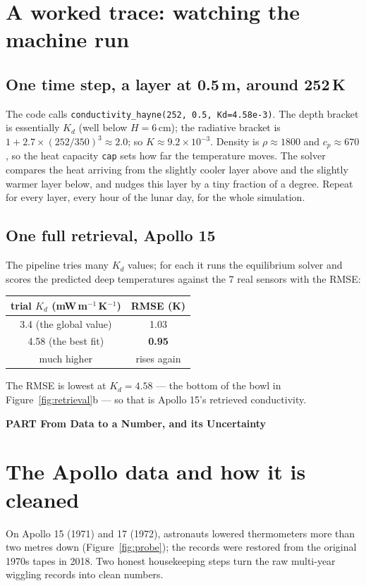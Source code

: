 \documentclass[11pt]{article}
\newcounter{partno}
\newcommand{\partdivider}[1]{%
  \par\addvspace{10pt}\refstepcounter{partno}\FloatBarrier
  \noindent\begin{tcolorbox}[colback=teal!14!white,colframe=teal!50!black,
    boxrule=1pt,arc=2pt,left=10pt,right=10pt,top=5pt,bottom=5pt,
    before skip=4pt,after skip=6pt]
  \centering\large\bfseries\color{teal!40!black}
  PART \Roman{partno}\quad\textbullet\quad #1\end{tcolorbox}\par\addvspace{3pt}}
\renewcommand{\partdivider}[1]{\par\addvspace{10pt}\refstepcounter{partno}%
    \FloatBarrier\noindent\begin{tcolorbox}[colback=gray!15!white,colframe=black,
      boxrule=1pt,arc=2pt,left=10pt,right=10pt,top=5pt,bottom=5pt,
      before skip=4pt,after skip=6pt]\centering\large\bfseries\color{black}
    PART \Roman{partno}\quad\textbullet\quad #1\end{tcolorbox}\par\addvspace{3pt}}
\begin{document}
\section{A worked trace: watching the machine run}
\subsection{One time step, a layer at 0.5\,m, around 252\,K}
The code calls \texttt{conductivity\_hayne(252, 0.5, Kd=4.58e-3)}. The
depth bracket is essentially $K_d$ (well below $H=6\,$cm); the radiative
bracket is $1+2.7\times(252/350)^3\approx2.0$; so
$K\approx9.2\times10^{-3}$. Density is $\rho\approx1800$ and
$c_p\approx670$, so the heat capacity \texttt{cap} sets how far the
temperature moves. The solver compares the heat arriving from the
slightly cooler layer above and the slightly warmer layer below, and
nudges this layer by a tiny fraction of a degree. Repeat for every layer,
every hour of the lunar day, for the whole simulation.

\subsection{One full retrieval, Apollo 15}
The pipeline tries many $K_d$ values; for each it runs the equilibrium
solver and scores the predicted deep temperatures against the 7 real
sensors with the RMSE:
\begin{center}\small
\renewcommand{\arraystretch}{1.1}
\begin{tabular}{cc}
\toprule
trial $K_d$ (mW\,m$^{-1}$\,K$^{-1}$) & RMSE (K) \\
\midrule
3.4 (the global value) & 1.03 \\
4.58 (the best fit)    & \textbf{0.95} \\
much higher            & rises again \\
\bottomrule
\end{tabular}
\end{center}
The RMSE is lowest at $K_d=4.58$ --- the bottom of the bowl in
Figure~\ref{fig:retrieval}b --- so that is Apollo 15's retrieved
conductivity.

\partdivider{From Data to a Number, and its Uncertainty}

\section{The Apollo data and how it is cleaned}
On Apollo 15 (1971) and 17 (1972), astronauts lowered thermometers more
than two metres down (Figure~\ref{fig:probe}); the records were restored
from the original 1970s tapes in 2018. Two honest housekeeping steps turn
the raw multi-year wiggling records into clean numbers.
\end{document}
